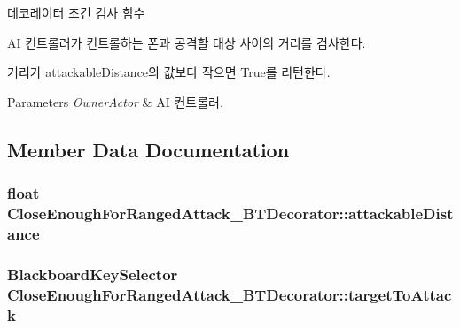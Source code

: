 데코레이터 조건 검사 함수 

AI 컨트롤러가 컨트롤하는 폰과 공격할 대상 사이의 거리를 검사한다.

거리가 attackable\+Distance의 값보다 작으면 True를 리턴한다. 
\begin{DoxyParams}{Parameters}
{\em Owner\+Actor} & AI 컨트롤러. \\
\hline
\end{DoxyParams}


\subsection{Member Data Documentation}
\subsubsection[{\texorpdfstring{attackable\+Distance}{attackableDistance}}]{\setlength{\rightskip}{0pt plus 5cm}float Close\+Enough\+For\+Ranged\+Attack\+\_\+\+B\+T\+Decorator\+::attackable\+Distance}\hypertarget{class_close_enough_for_ranged_attack___b_t_decorator_a28155d62ff5f45740dad3dfec7254e5e}{}\label{class_close_enough_for_ranged_attack___b_t_decorator_a28155d62ff5f45740dad3dfec7254e5e}
\subsubsection[{\texorpdfstring{target\+To\+Attack}{targetToAttack}}]{\setlength{\rightskip}{0pt plus 5cm}Blackboard\+Key\+Selector Close\+Enough\+For\+Ranged\+Attack\+\_\+\+B\+T\+Decorator\+::target\+To\+Attack}\hypertarget{class_close_enough_for_ranged_attack___b_t_decorator_a830126ebaba4083a84ea549114ef39d7}{}\label{class_close_enough_for_ranged_attack___b_t_decorator_a830126ebaba4083a84ea549114ef39d7}
